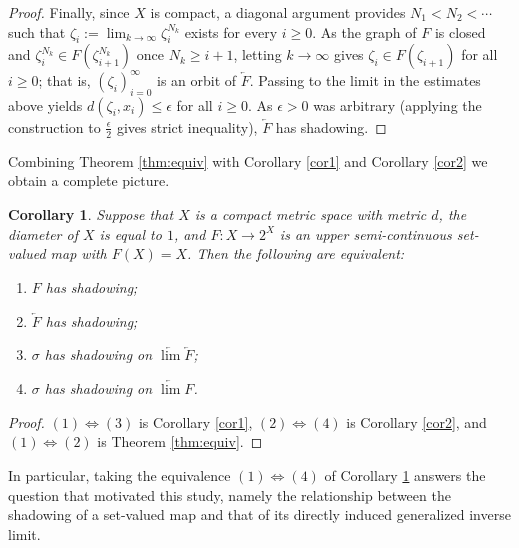 \documentclass[12pt]{amsart}
\newtheorem{corollary}[theorem]{Corollary}
\theoremstyle{definition}
\begin{document}
\begin{proof}
	Finally, since $X$ is compact, a diagonal argument provides $N_1<N_2<\cdots$ such that $\zeta_i:=\lim_{k\to\infty}\zeta_i^{N_k}$ exists for every $i\geq0$. As the graph of $F$ is closed and $\zeta_i^{N_k}\in F(\zeta_{i+1}^{N_k})$ once $N_k\geq i+1$, letting $k\to\infty$ gives $\zeta_i\in F(\zeta_{i+1})$ for all $i\geq0$; that is, $(\zeta_i)_{i=0}^\infty$ is an orbit of $\underleftarrow{F}$. Passing to the limit in the estimates above yields $d(\zeta_i,x_i)\leq\epsilon$ for all $i\geq0$. As $\epsilon>0$ was arbitrary (applying the construction to $\frac{\epsilon}{2}$ gives strict inequality), $\underleftarrow{F}$ has shadowing.
\end{proof}

Combining Theorem \ref{thm:equiv} with Corollary \ref{cor1} and Corollary \ref{cor2} we obtain a complete picture.

\begin{corollary}\label{cor:all}
	Suppose that $X$ is a compact metric space with metric $d$, the diameter of $X$ is equal to $1$, and $F:X\rightarrow 2^X$ is an upper semi-continuous set-valued map with $F(X)=X$. Then the following are equivalent:
	\begin{enumerate}
		\item $F$ has shadowing;
		\item $\underleftarrow{F}$ has shadowing;
		\item $\sigma$ has shadowing on $\underleftarrow{\lim} \underleftarrow{F}$;
		\item $\sigma$ has shadowing on $\underleftarrow{\lim} F$.
	\end{enumerate}
\end{corollary}
\begin{proof}
	$(1)\Leftrightarrow(3)$ is Corollary \ref{cor1}, $(2)\Leftrightarrow(4)$ is Corollary \ref{cor2}, and $(1)\Leftrightarrow(2)$ is Theorem \ref{thm:equiv}.
\end{proof}

In particular, taking the equivalence $(1)\Leftrightarrow(4)$ of Corollary \ref{cor:all} answers the question that motivated this study, namely the relationship between the shadowing of a set-valued map and that of its directly induced generalized inverse limit.
%
\end{document}
